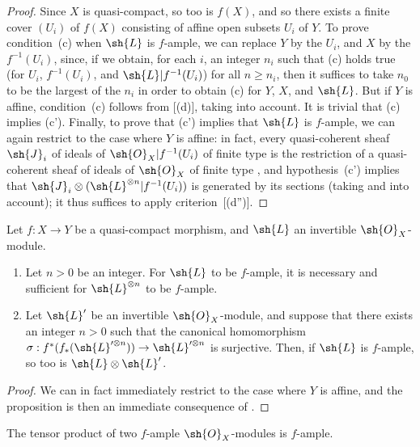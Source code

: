 \begin{proof}
Since $X$ is quasi-compact, so too is $f(X)$, and so there exists a finite cover $(U_i)$ of $f(X)$ consisting of affine open subsets $U_i$ of $Y$.
To prove condition~(c) when $\sh{L}$ is $f$-ample, we can replace $Y$ by the $U_i$, and $X$ by the $f^{-1}(U_i)$, since, if we obtain, for each $i$, an integer $n_i$ such that (c) holds true (for $U_i$, $f^{-1}(U_i)$, and $\sh{L}|f^{-1}(U_i)$) for all $n\geq n_i$, then it suffices to take $n_0$ to be the largest of the $n_i$ in order to obtain (c) for $Y$, $X$, and $\sh{L}$.
But if $Y$ is affine, condition~(c) follows from [(d)], taking  into account.
It is trivial that (c) implies (c').
Finally, to prove that (c') implies that $\sh{L}$ is $f$-ample, we can again restrict to the case where $Y$ is affine:
in fact, every quasi-coherent sheaf $\sh{J}_i$ of ideals of $\sh{O}_X|f^{-1}(U_i)$ of finite type is the restriction of a quasi-coherent sheaf of ideals of $\sh{O}_X$ of finite type , and hypothesis~(c') implies that
$\sh{J}_i\otimes(\sh{L}^{\otimes n}|f^{-1}(U_i))$ is generated by its sections (taking  and  into account);
it thus suffices to apply criterion~[(d'')].
\end{proof}

\begin{proposition}[4.6.9]
\label{II.4.6.9}
Let $f:X\to Y$ be a quasi-compact morphism, and $\sh{L}$ an invertible $\sh{O}_X$-module.
\begin{enumerate}
  \item[\rm{(i)}] Let $n>0$ be an integer.
    For $\sh{L}$ to be $f$-ample, it is necessary and sufficient for $\sh{L}^{\otimes n}$ to be $f$-ample.
  \item[\rm{(ii)}] Let $\sh{L}'$ be an invertible $\sh{O}_X$-module, and suppose that there exists an integer $n>0$ such that the canonical homomorphism $\sigma:f^*(f_*(\sh{L}'^{\otimes n}))\to\sh{L}'^{\otimes n}$ is surjective.
    Then, if $\sh{L}$ is $f$-ample, so too is $\sh{L}\otimes\sh{L}'$.
\end{enumerate}
\end{proposition}

\begin{proof}
We can in fact immediately restrict to the case where $Y$ is affine, and the proposition is then an immediate consequence of .
\end{proof}

\begin{corollary}[4.6.10]
\label{II.4.6.10}
The tensor product of two $f$-ample $\sh{O}_X$-modules is $f$-ample.
\end{corollary}

